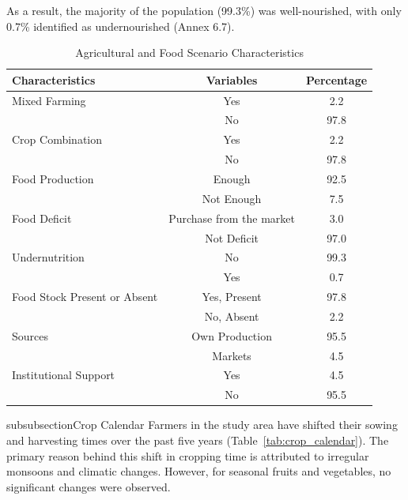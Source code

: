 As a result, the majority of the population (99.3\%) was well-nourished, with only 0.7\% identified as undernourished (Annex 6.7).

\begin{table}[htbp]
    \centering
    \caption{Agricultural and Food Scenario Characteristics}
    \label{tab:agriculture_food_scenario}
    \begin{tabular}{@{}lcc@{}}
        \toprule
        \textbf{Characteristics} & \textbf{Variables} & \textbf{Percentage} \\
        \midrule
        Mixed Farming & Yes & 2.2 \\
                     & No & 97.8 \\
        Crop Combination & Yes & 2.2 \\
                         & No & 97.8 \\
        Food Production & Enough & 92.5 \\
                        & Not Enough & 7.5 \\
        Food Deficit & Purchase from the market & 3.0 \\
                     & Not Deficit & 97.0 \\
        Undernutrition & No & 99.3 \\
                       & Yes & 0.7 \\
        Food Stock Present or Absent & Yes, Present & 97.8 \\
                                     & No, Absent & 2.2 \\
        Sources & Own Production & 95.5 \\
                & Markets & 4.5 \\
        Institutional Support & Yes & 4.5 \\
                              & No & 95.5 \\
        \bottomrule
    \end{tabular}
\end{table}

subsubsection{Crop Calendar}
Farmers in the study area have shifted their sowing and harvesting times over the past five years (Table~\ref{tab:crop_calendar}). The primary reason behind this shift in cropping time is attributed to irregular monsoons and climatic changes. However, for seasonal fruits and vegetables, no significant changes were observed. 

